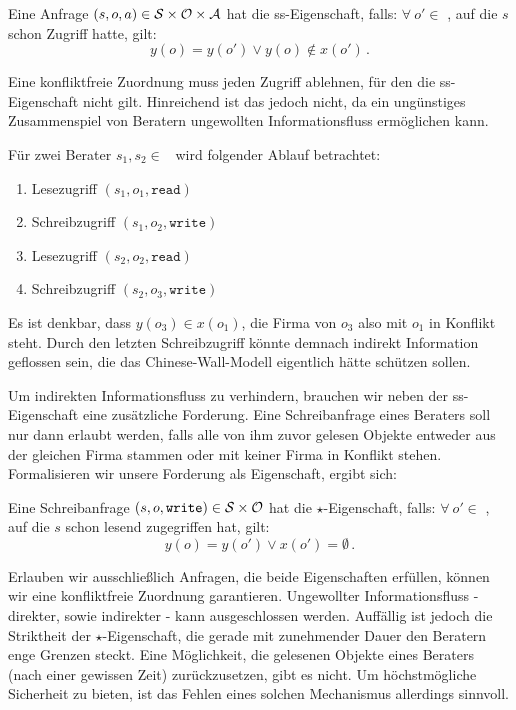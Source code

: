 \begin{definition}\indexCWSimpleSecurity
  Eine Anfrage $(s, o, a) \in \mathcal{S} \times \mathcal{O} \times \mathcal{A}$ hat die
  ss-Eigenschaft, falls: \(\forall\ o' \in\) \calO, auf die \(s\) schon
  Zugriff hatte, gilt:
  \[
    y(o) = y(o') \lor y(o) \notin x(o')\, .
  \]
\end{definition}

Eine konfliktfreie Zuordnung muss jeden Zugriff ablehnen, für den die
ss-Eigenschaft nicht gilt. Hinreichend ist das jedoch nicht, da ein
ungünstiges Zusammenspiel von Beratern ungewollten Informationsfluss
ermöglichen kann. 

\begin{beispiel}
  Für zwei Berater \(s_1, s_2 \in\) \calS\ wird folgender Ablauf betrachtet:
  \begin{multicols}{2}
    \begin{enumerate}
    \item Lesezugriff \((s_1, o_1, \texttt{read})\)
    \item Schreibzugriff \((s_1, o_2, \texttt{write})\)
    \item Lesezugriff \((s_2, o_2, \texttt{read})\)
    \item Schreibzugriff \((s_2, o_3, \texttt{write})\)
    \end{enumerate}
  \end{multicols}
  Es ist denkbar, dass \(y(o_3) \in x(o_1)\), die Firma von \(o_3\) also
  mit \(o_1\) in Konflikt steht. Durch den letzten Schreibzugriff könnte
  demnach indirekt Information geflossen sein, die das
  Chinese-Wall-Modell eigentlich hätte schützen sollen.  
\end{beispiel}

Um indirekten Informationsfluss zu verhindern, brauchen wir neben der
ss-Eigenschaft eine zusätzliche Forderung. Eine Schreibanfrage eines
Beraters soll nur dann erlaubt werden, falls alle von ihm zuvor gelesen
Objekte entweder aus der gleichen Firma stammen oder mit keiner Firma in
Konflikt stehen. Formalisieren wir unsere Forderung als Eigenschaft,
ergibt sich:

\begin{definition}\indexCWStarProperty
  Eine Schreibanfrage $(s, o, \texttt{write}) \in \mathcal{S} \times \mathcal{O}$
  hat die \(\star\)-Eigenschaft, falls: \(\forall\ o' \in\) \calO, auf
  die \(s\) schon lesend zugegriffen hat, gilt: 
  \[
    y(o) = y(o') \lor x(o') = \emptyset\, .
  \]
\end{definition}

Erlauben wir ausschließlich Anfragen, die beide Eigenschaften erfüllen,
können wir eine konfliktfreie Zuordnung garantieren. Ungewollter
Informationsfluss - direkter, sowie indirekter - kann ausgeschlossen
werden. Auffällig ist jedoch die Striktheit der \(\star\)-Eigenschaft,
die gerade mit zunehmender Dauer den Beratern enge Grenzen steckt. Eine
Möglichkeit, die gelesenen Objekte eines Beraters (nach einer gewissen
Zeit) zurückzusetzen, gibt es nicht. Um höchstmögliche Sicherheit zu
bieten, ist das Fehlen eines solchen Mechanismus allerdings sinnvoll.

